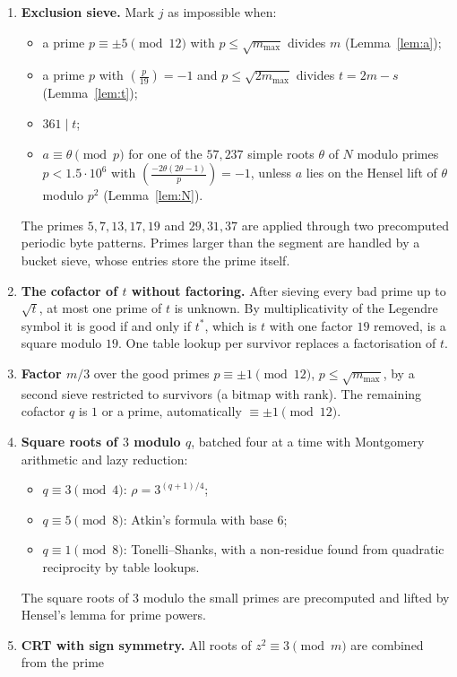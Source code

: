 \documentclass[11pt]{article}
\theoremstyle{remark}
\theoremstyle{definition}
\newcommand{\leg}[2]{\left(\frac{#1}{#2}\right)}
\begin{document}
\begin{enumerate}
\item \textbf{Exclusion sieve.}  Mark $j$ as impossible when:
  \begin{itemize}
  \item a prime $p\equiv\pm5\pmod{12}$ with $p\le\sqrt{m_{\max}}$ divides $m$ (Lemma~\ref{lem:a});
  \item a prime $p$ with $\leg p{19}=-1$ and $p\le\sqrt{2m_{\max}}$ divides $t=2m-s$
    (Lemma~\ref{lem:t});
  \item $361\mid t$;
  \item $a\equiv\theta\pmod p$ for one of the $57{,}237$ simple roots $\theta$ of $N$ modulo primes
    $p<1.5\cdot10^6$ with $\leg{-2\theta(2\theta-1)}{p}=-1$, unless $a$ lies on the Hensel lift of
    $\theta$ modulo $p^2$ (Lemma~\ref{lem:N}).
  \end{itemize}
  The primes $5,7,13,17,19$ and $29,31,37$ are applied through two precomputed periodic byte
  patterns.  Primes larger than the segment are handled by a bucket sieve, whose entries store
  the prime itself.
\item \textbf{The cofactor of $t$ without factoring.}  After sieving every bad prime up to
  $\sqrt{t}$, at most one prime of $t$ is unknown.  By multiplicativity of the Legendre symbol it
  is good if and only if $t^*$, which is $t$ with one factor $19$ removed, is a square modulo $19$.
  One table lookup per survivor replaces a factorisation of $t$.
\item \textbf{Factor $m/3$} over the good primes $p\equiv\pm1\pmod{12}$, $p\le\sqrt{m_{\max}}$, by a
  second sieve restricted to survivors (a bitmap with rank).  The remaining cofactor $q$ is $1$ or
  a prime, automatically $\equiv\pm1\pmod{12}$.
\item \textbf{Square roots of $3$ modulo $q$}, batched four at a time with Montgomery arithmetic
  and lazy reduction:
  \begin{itemize}
  \item $q\equiv3\pmod4$: $\rho=3^{(q+1)/4}$;
  \item $q\equiv5\pmod8$: Atkin's formula with base $6$;
  \item $q\equiv1\pmod 8$: Tonelli--Shanks, with a non-residue found from quadratic reciprocity
    by table lookups.
  \end{itemize}
  The square roots of $3$ modulo the small primes are precomputed and lifted by Hensel's lemma for
  prime powers.
\item \textbf{CRT with sign symmetry.}  All roots of $z^2\equiv3\pmod m$ are combined from the prime

\end{enumerate}
\end{document}
